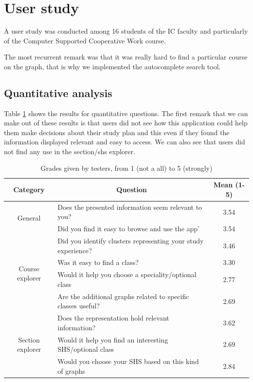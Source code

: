 \section{User study}
A user study was conducted among 16 students of the IC faculty and particularly of the Computer Supported Cooperative Work course.  

The most recurrent remark was that it was really hard to find a particular course on the graph, that is why we implemented the autocomplete search tool.

\subsection{Quantitative analysis}
Table \ref{tab:userstudy} shows the results for quantitative questions. The first remark that we can make out of these results is that users did not see how this application could help them make decisions about their study plan and this even if they found the information displayed relevant and easy to access. We can also see that users did not find any use in the section/shs explorer. 
\begin{table}[H]
\center
\begin{tabular}{|c|l|c|}
\hline 
Category & \multicolumn{1}{|c|}{Question} & Mean (1-5)\\
\hline
\multirow{2}{*}{General} 
	& Does the presented information seem relevant to you? & 3.54 \\
	& Did you find it easy to browse and use the app' & 3.54 \\
\hline
\multirow{4}{*}{Course explorer}
	& Did you identify clusters representing your study experience? & 3.46 \\
	& Was it easy to find a class? & 3.30 \\
	& Would it help you choose a speciality/optional class & 2.77 \\
	& Are the additional graphs related to specific classes useful? & 2.69\\
\hline
\multirow{4}{*}{Section explorer}
	& Does the representation hold relevant information? & 3.62 \\
	& Would it help you find an interesting SHS/optional class & 2.69 \\
	& Would you choose your SHS based on this kind of graphs& 2.84 \\
\hline
\end{tabular}
\label{tab:userstudy}
\caption{Grades given by testers, from 1 (not a all) to 5 (strongly)}
\end{table}

